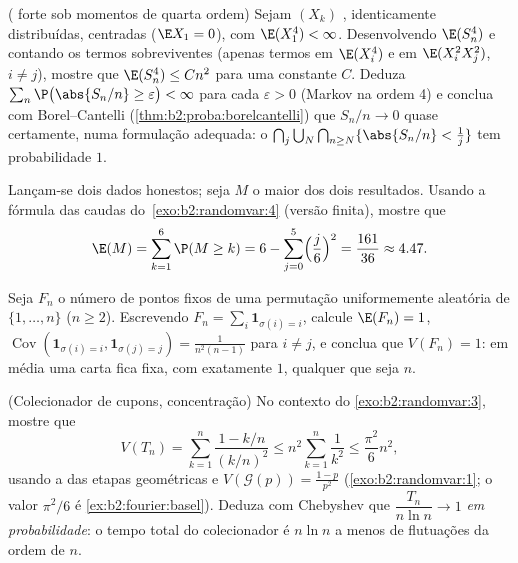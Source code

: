 \begin{exercise}[$\star\star\star$]\label{exo:b2:randomvar:9}
( forte sob momentos de quarta ordem) Sejam $(X_k)$ ,
identicamente distribuídas, centradas ($\E X_1 = 0$), com
$\E(X_1^4) < \infty$. Desenvolvendo $\E(S_n^4)$ e contando os
termos sobreviventes (apenas termos em $\E(X_i^4)$ e em $\E(X_i^2X_j^2)$, $i
\neq j$), mostre que $\E(S_n^4) \leq C n^2$ para uma constante $C$. Deduza
$\sum_n \P\bigl(\abs{S_n/n} \geq \varepsilon\bigr) < \infty$
para cada $\varepsilon > 0$ (Markov na ordem 4) e conclua com
Borel--Cantelli (\cref{thm:b2:proba:borelcantelli}) que
$S_n/n \to 0$ quase certamente, numa formulação adequada: o
 $\bigcap_{j}\bigcup_N\bigcap_{n \geq N}\{\abs{S_n/n} <
\frac1j\}$ tem probabilidade $1$.
\end{exercise}

\begin{exercise}[$\star$]\label{exo:b2:randomvar:10}
Lançam-se dois dados honestos; seja $M$ o maior dos dois
resultados. Usando a fórmula das caudas do~\cref{exo:b2:randomvar:4}
(versão finita), mostre que
\[
\E(M) = \sum_{k=1}^{6}\P(M \geq k)
= 6 - \sum_{j=0}^5\Bigl(\frac j6\Bigr)^2 = \frac{161}{36}
\approx 4.47 .
\]
\end{exercise}

\begin{exercise}[$\star\star$]\label{exo:b2:randomvar:11}
Seja $F_n$ o número de pontos fixos de uma permutação uniformemente
aleatória de $\{1, \dots, n\}$ ($n \geq 2$). Escrevendo $F_n =
\sum_i\mathbf 1_{\sigma(i) = i}$, calcule $\E(F_n) = 1$,
$\operatorname{Cov}(\mathbf 1_{\sigma(i)=i}, \mathbf
1_{\sigma(j)=j}) = \frac1{n^2(n-1)}$ para $i \neq j$, e
conclua que $V(F_n) = 1$: em média uma carta fica fixa, com
 exatamente $1$, qualquer que seja $n$.
\end{exercise}

\begin{exercise}[$\star\star\star$]\label{exo:b2:randomvar:12}
(Colecionador de cupons, concentração) No contexto do
\cref{exo:b2:randomvar:3}, mostre que
\[
V(T_n) = \sum_{k=1}^n\frac{1 - k/n}{(k/n)^2}
\leq n^2\sum_{k=1}^n\frac{1}{k^2} \leq \frac{\pi^2}{6}n^2,
\]
usando a  das etapas geométricas e $V(\mathcal
G(p)) = \frac{1-p}{p^2}$ (\cref{exo:b2:randomvar:1}; o valor
$\pi^2/6$ é \cref{ex:b2:fourier:basel}). Deduza com
Chebyshev que $\dfrac{T_n}{n\ln n} \to 1$ \emph{em
probabilidade}: o tempo total do colecionador é $n\ln n$ a menos de
flutuações da ordem de $n$.
\end{exercise}

